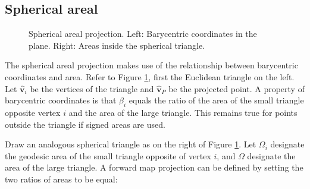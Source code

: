 \documentclass{amsart}[12pt]
\begin{document}
\subsection{Spherical areal}
\begin{figure}%
	\caption{Spherical areal projection. Left: Barycentric coordinates in the plane. Right: Areas  inside the spherical triangle.}
	\label{fig:sphericalareal}
\end{figure}
The spherical areal projection makes use of the relationship between barycentric coordinates and area. Refer to Figure \ref{fig:sphericalareal}, first the Euclidean triangle on the left. Let $\hat{\mathbf v}_i$ be the vertices of the triangle and $\hat{\mathbf v}_P$ be the projected point. A property of barycentric coordinates is that $\beta_i$ equals the ratio of the area of the small triangle opposite vertex $i$ and the area of the large triangle. This remains true for points outside the triangle if signed areas are used.

Draw an analogous spherical triangle as on the right of Figure \ref{fig:sphericalareal}. Let $\Omega_i$ designate the geodesic area of the small triangle opposite of vertex $i$, and $\Omega$ designate the area of the large triangle. A forward map projection can be defined by setting the two ratios of areas to be equal:
\end{document}
